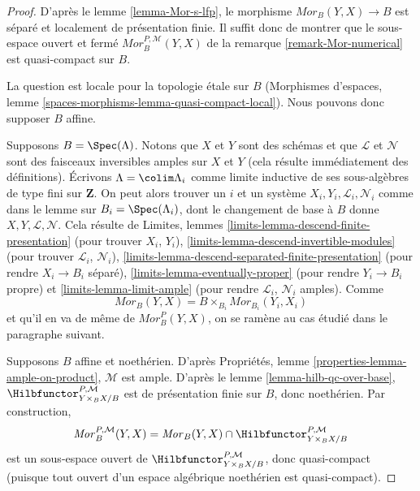\begin{proof}
D'après le lemme \ref{lemma-Mor-s-lfp}, le morphisme
$\mathit{Mor}_B(Y, X) \to B$ est séparé et localement de présentation
finie. Il suffit donc de montrer que le sous-espace ouvert et fermé
$\mathit{Mor}^{P, \mathcal{M}}_B(Y, X)$ de la remarque
\ref{remark-Mor-numerical} est quasi-compact sur $B$.

\medskip\noindent
La question est locale pour la topologie \'etale sur $B$
(Morphismes d'espaces, lemme
\ref{spaces-morphisms-lemma-quasi-compact-local}).
Nous pouvons donc supposer $B$ affine.

\medskip\noindent
Supposons $B = \Spec(\Lambda)$. Notons que $X$ et $Y$ sont des schémas et
que $\mathcal{L}$ et $\mathcal{N}$ sont des faisceaux inversibles amples
sur $X$ et $Y$ (cela résulte immédiatement des définitions).
Écrivons $\Lambda = \colim \Lambda_i$ comme limite inductive de ses
sous-algèbres de type fini sur $\mathbf{Z}$. On peut alors trouver un $i$
et un système $X_i, Y_i, \mathcal{L}_i, \mathcal{N}_i$ comme dans le lemme
sur $B_i = \Spec(\Lambda_i)$, dont le changement de base à $B$ donne
$X, Y, \mathcal{L}, \mathcal{N}$. Cela résulte de Limites, lemmes
\ref{limits-lemma-descend-finite-presentation} (pour trouver $X_i$, $Y_i$),
\ref{limits-lemma-descend-invertible-modules} (pour trouver
$\mathcal{L}_i$, $\mathcal{N}_i$),
\ref{limits-lemma-descend-separated-finite-presentation} (pour rendre
$X_i \to B_i$ séparé), \ref{limits-lemma-eventually-proper} (pour rendre
$Y_i \to B_i$ propre) et \ref{limits-lemma-limit-ample} (pour rendre
$\mathcal{L}_i$, $\mathcal{N}_i$ amples).
Comme
$$
\mathit{Mor}_B(Y, X) = B \times_{B_i} \mathit{Mor}_{B_i}(Y_i, X_i)
$$
et qu'il en va de même de $\mathit{Mor}^P_B(Y, X)$, on se ramène au cas
étudié dans le paragraphe suivant.

\medskip\noindent
Supposons $B$ affine et noethérien. D'après Propriétés, lemme
\ref{properties-lemma-ample-on-product}, $\mathcal{M}$ est ample.
D'après le lemme \ref{lemma-hilb-qc-over-base},
$\Hilbfunctor^{P, \mathcal{M}}_{Y \times_B X/B}$ est de présentation finie
sur $B$, donc noethérien. Par construction,
$$
\mathit{Mor}^{P, \mathcal{M}}_B(Y, X) =
\mathit{Mor}_B(Y, X) \cap
\Hilbfunctor^{P, \mathcal{M}}_{Y \times_B X/B}
$$
est un sous-espace ouvert de
$\Hilbfunctor^{P, \mathcal{M}}_{Y \times_B X/B}$, donc quasi-compact
(puisque tout ouvert d'un espace algébrique noethérien est quasi-compact).
\end{proof}






